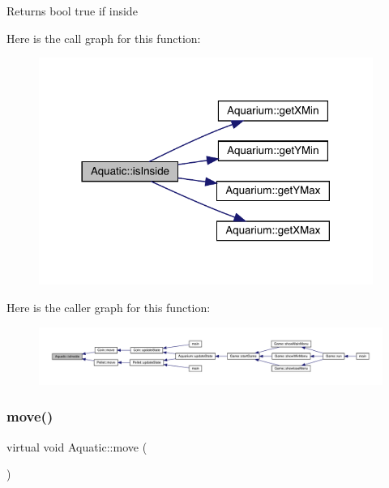 \begin{DoxyReturn}{Returns}
bool true if inside 
\end{DoxyReturn}
Here is the call graph for this function\+:\nopagebreak
\begin{figure}[H]
\begin{center}
\leavevmode
\includegraphics[width=309pt]{class_aquatic_a2c438132d8b625d3c2187ff5735193a0_cgraph}
\end{center}
\end{figure}
Here is the caller graph for this function\+:
\nopagebreak
\begin{figure}[H]
\begin{center}
\leavevmode
\includegraphics[width=350pt]{class_aquatic_a2c438132d8b625d3c2187ff5735193a0_icgraph}
\end{center}
\end{figure}
\mbox{\label{class_aquatic_a962e93c804814eeaf3cea6e26698eef7}} 
\subsubsection{\texorpdfstring{move()}{move()}}
{\footnotesize\ttfamily virtual void Aquatic\+::move (\begin{DoxyParamCaption}{ }\end{DoxyParamCaption})\hspace{0.3cm}{\ttfamily [pure virtual]}}



